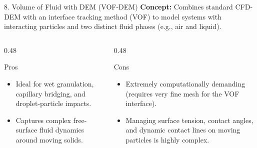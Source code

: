\begin{frame}{8. Volume of Fluid with DEM (VOF-DEM)}
    \textbf{Concept:} Combines standard CFD-DEM with an interface tracking method (VOF) to model systems with interacting particles and two distinct fluid phases (e.g., air and liquid).
    \vspace{0.3cm}
    
    \begin{columns}[T]
        \begin{column}{0.48\textwidth}
            \begin{block}{Pros}
                \begin{itemize}
                    \item Ideal for wet granulation, capillary bridging, and droplet-particle impacts.
                    \item Captures complex free-surface fluid dynamics around moving solids.
                \end{itemize}
            \end{block}
        \end{column}
        
        \begin{column}{0.48\textwidth}
            \begin{alertblock}{Cons}
                \begin{itemize}
                    \item Extremely computationally demanding (requires very fine mesh for the VOF interface).
                    \item Managing surface tension, contact angles, and dynamic contact lines on moving particles is highly complex.
                \end{itemize}
            \end{alertblock}
        \end{column}
    \end{columns}
\end{frame}

